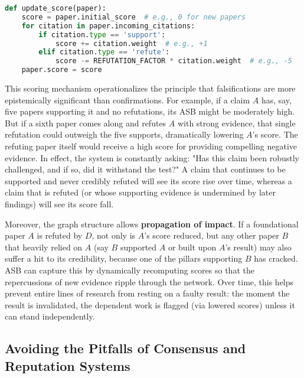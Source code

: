 \documentclass{article}
\begin{document}
\begin{lstlisting}[language=Python, caption={Simplified pseudo-code for updating a paper's credibility score based on new evidence.}, label={lst:score}]
def update_score(paper):
    score = paper.initial_score  # e.g., 0 for new papers
    for citation in paper.incoming_citations:
        if citation.type == 'support':
            score += citation.weight  # e.g., +1
        elif citation.type == 'refute':
            score -= REFUTATION_FACTOR * citation.weight  # e.g., -5
    paper.score = score
\end{lstlisting}

This scoring mechanism operationalizes the principle that falsifications are more epistemically significant than confirmations. For example, if a claim $A$ has, say, five papers supporting it and no refutations, its ASB might be moderately high. But if a sixth paper comes along and refutes $A$ with strong evidence, that single refutation could outweigh the five supports, dramatically lowering $A$'s score. The refuting paper itself would receive a high score for providing compelling negative evidence. In effect, the system is constantly asking: "Has this claim been robustly challenged, and if so, did it withstand the test?" A claim that continues to be supported and never credibly refuted will see its score rise over time, whereas a claim that is refuted (or whose supporting evidence is undermined by later findings) will see its score fall.

Moreover, the graph structure allows \textbf{propagation of impact}. If a foundational paper $A$ is refuted by $D$, not only is $A$'s score reduced, but any other paper $B$ that heavily relied on $A$ (say $B$ supported $A$ or built upon $A$'s result) may also suffer a hit to its credibility, because one of the pillars supporting $B$ has cracked. ASB can capture this by dynamically recomputing scores so that the repercussions of new evidence ripple through the network. Over time, this helps prevent entire lines of research from resting on a faulty result: the moment the result is invalidated, the dependent work is flagged (via lowered scores) unless it can stand independently. 


\subsection{Avoiding the Pitfalls of Consensus and Reputation Systems}
\end{document}
